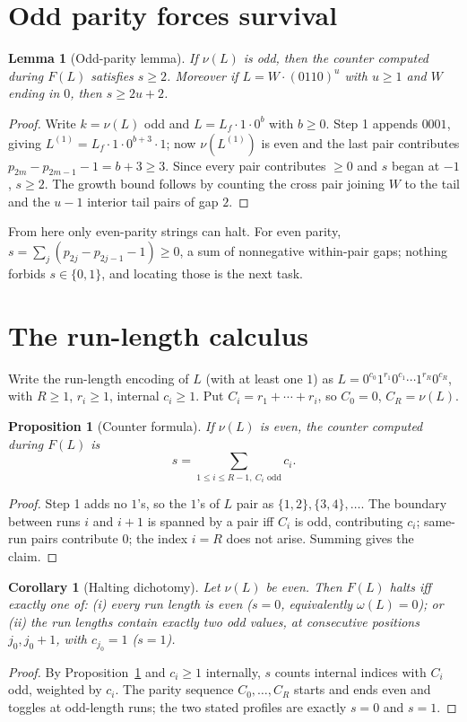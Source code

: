 \documentclass[11pt,reqno]{amsart}
\theoremstyle{plain}
\newtheorem{proposition}{Proposition}
\newtheorem{lemma}{Lemma}
\newtheorem{corollary}{Corollary}
\theoremstyle{definition}
\theoremstyle{remark}
\begin{document}
\section{Odd parity forces survival}\label{sec:odd}
\begin{lemma}[Odd-parity lemma]\label{lem:odd}
If $\nu(L)$ is odd, then the counter computed during $F(L)$ satisfies $s\ge 2$. Moreover if $L=W\cdot(0110)^u$ with $u\ge 1$ and $W$ ending in $0$, then $s\ge 2u+2$.
\end{lemma}
\begin{proof}
Write $k=\nu(L)$ odd and $L=L_f\cdot 1\cdot 0^b$ with $b\ge 0$. Step 1 appends $0001$, giving $L^{(1)}=L_f\cdot 1\cdot 0^{b+3}\cdot 1$; now $\nu(L^{(1)})$ is even and the last pair contributes $p_{2m}-p_{2m-1}-1=b+3\ge 3$. Since every pair contributes $\ge 0$ and $s$ began at $-1$, $s\ge 2$. The growth bound follows by counting the cross pair joining $W$ to the tail and the $u-1$ interior tail pairs of gap $2$.
\end{proof}

From here only even-parity strings can halt. For even parity, $s=\sum_j(p_{2j}-p_{2j-1}-1)\ge 0$, a sum of nonnegative within-pair gaps; nothing forbids $s\in\{0,1\}$, and locating those is the next task.

\section{The run-length calculus}\label{sec:rl}
Write the run-length encoding of $L$ (with at least one $1$) as $L=0^{c_0}1^{r_1}0^{c_1}\cdots 1^{r_R}0^{c_R}$, with $R\ge 1$, $r_i\ge 1$, internal $c_i\ge 1$. Put $C_i=r_1+\cdots+r_i$, so $C_0=0$, $C_R=\nu(L)$.

\begin{proposition}[Counter formula]\label{prop:counter}
If $\nu(L)$ is even, the counter computed during $F(L)$ is
\[ s=\sum_{1\le i\le R-1,\ C_i\text{ odd}} c_i. \]
\end{proposition}
\begin{proof}
Step 1 adds no $1$'s, so the $1$'s of $L$ pair as $\{1,2\},\{3,4\},\dots$. The boundary between runs $i$ and $i+1$ is spanned by a pair iff $C_i$ is odd, contributing $c_i$; same-run pairs contribute $0$; the index $i=R$ does not arise. Summing gives the claim.
\end{proof}

\begin{corollary}[Halting dichotomy]\label{cor:halting}
Let $\nu(L)$ be even. Then $F(L)$ halts iff exactly one of: (i) every run length is even ($s=0$, equivalently $\omega(L)=0$); or (ii) the run lengths contain exactly two odd values, at consecutive positions $j_0,j_0+1$, with $c_{j_0}=1$ ($s=1$).
\end{corollary}
\begin{proof}
By Proposition~\ref{prop:counter} and $c_i\ge 1$ internally, $s$ counts internal indices with $C_i$ odd, weighted by $c_i$. The parity sequence $C_0,\dots,C_R$ starts and ends even and toggles at odd-length runs; the two stated profiles are exactly $s=0$ and $s=1$.
\end{proof}
\end{document}
